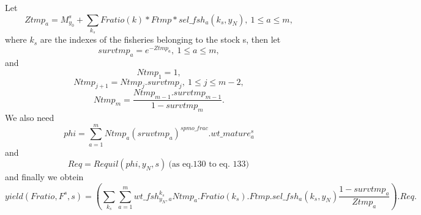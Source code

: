 \documentclass{article}
\begin{document}
Let
\begin{equation}
    Ztmp_a=M^s_{y_0}+\sum_{k_s}Fratio(k)*Ftmp*sel\_fsh_a(k_s,y_N), \ 1\leq a \leq m, 
\end{equation}
where $k_s$ are the indexes of the fisheries belonging to the stock s, then let
\begin{equation}
    survtmp_a=e^{-Ztmp_a}, \ 1\leq a \leq m,
\end{equation}
and
\begin{equation}
    Ntmp_1=1,
\end{equation}
\begin{equation}
    Ntmp_{j+1}=Ntmp_j.survtmp_j, \ 1\leq j \leq m-2,
\end{equation}
\begin{equation}
    Ntmp_m=\dfrac{Ntmp_{m-1}.survtmp_{m-1}}{1-survtmp_m}.
\end{equation}
We also need
\begin{equation}
    phi=\sum_{a=1}^m Ntmp_a(sruvtmp_a)^{spmo\_frac}.wt\_mature^s_a
\end{equation}
and
\begin{equation}
    Req=Requil(phi,y_N,s) \  \text{(as eq.130 to eq. 133)}\,
\end{equation}
and finally we obtein
\begin{equation}
    yield(Fratio, F^s,s)=\left(\sum_{k_s}\sum_{a=1}^m wt\_fsh^{k_s}_{y_N,a}Ntmp_a.Fratio(k_s).Ftmp.sel\_fsh_a(k_s,y_N)\dfrac{1-survtmp_a}{Ztmp_a}\right).Req.
\end{equation}
\end{document}
